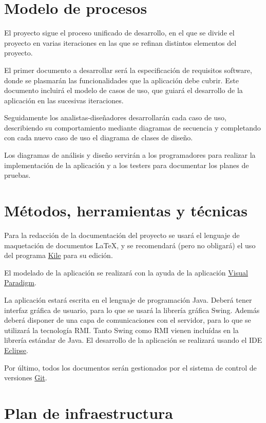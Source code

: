 \section{Modelo de procesos}

El proyecto sigue el proceso unificado de desarrollo, en el que se divide el
proyecto en varias iteraciones en las que se refinan distintos elementos del
proyecto.

El primer documento a desarrollar será la especificación de requisitos
software, donde se plasmarán las funcionalidades que la aplicación debe cubrir.
Este documento incluirá el modelo de casos de uso, que guiará el desarrollo de
la aplicación en las sucesivas iteraciones.

Seguidamente los analistas-diseñadores desarrollarán cada caso de uso,
describiendo su comportamiento mediante diagramas de secuencia y completando con
cada nuevo caso de uso el diagrama de clases de diseño.

Los diagramas de análisis y diseño servirán a los programadores para realizar
la implementación de la aplicación y a los testers para documentar los planes
de pruebas.

\section{Métodos, herramientas y técnicas}

Para la redacción de la documentación del proyecto se usará el lenguaje de
maquetación de documentos \LaTeX, y se recomendará (pero no obligará) el uso
del programa \href{http://kile.sourceforge.net}{Kile} para su edición.

El modelado de la aplicación se realizará con la ayuda de la aplicación
\href{http://www.visual-paradigm.com}{Visual Paradigm}.

La aplicación estará escrita en el lenguaje de programación Java. Deberá tener
interfaz gráfica de usuario, para lo que se usará la librería gráfica Swing.
Además deberá disponer de una capa de comunicaciones con el servidor, para lo
que se utilizará la tecnología RMI. Tanto Swing como RMI vienen incluídas en la
librería estándar de Java. El desarrollo de la aplicación se realizará usando
el IDE \href{http://www.eclipse.org}{Eclipse}.

Por último, todos los documentos serán gestionados por el sistema de control de
versiones \href{http://git-scm.com}{Git}.

\section{Plan de infraestructura}

